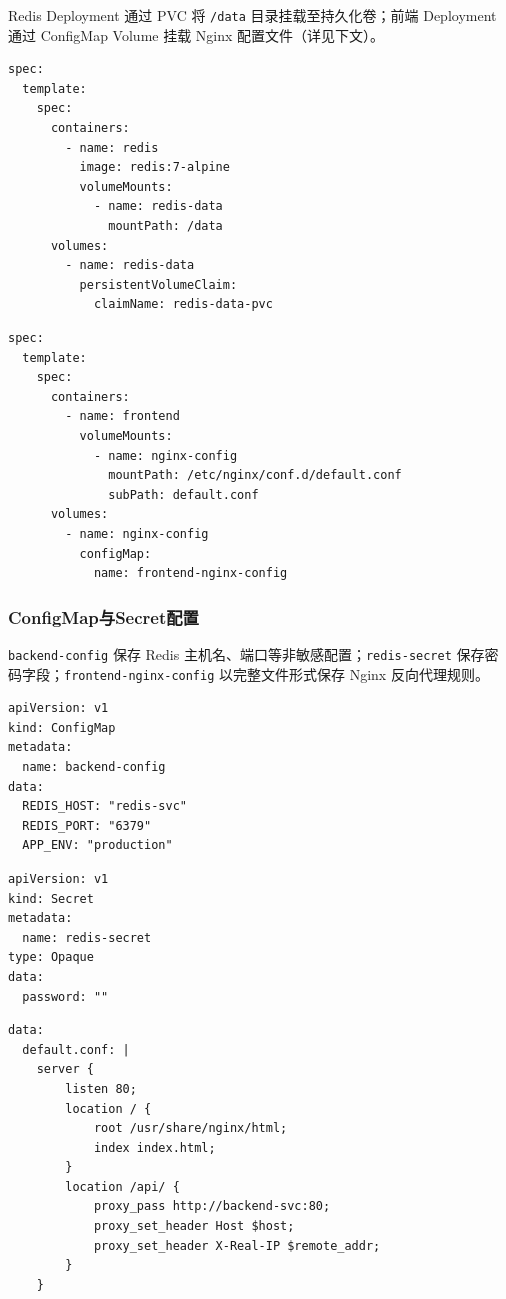 Redis Deployment 通过 PVC 将 \verb|/data| 目录挂载至持久化卷；前端 Deployment 通过 ConfigMap Volume 挂载 Nginx 配置文件（详见下文）。

\begin{lstlisting}[caption={k8s/redis-deployment.yaml（PVC 挂载节选）}, label=lst:redis-deploy]
spec:
  template:
    spec:
      containers:
        - name: redis
          image: redis:7-alpine
          volumeMounts:
            - name: redis-data
              mountPath: /data
      volumes:
        - name: redis-data
          persistentVolumeClaim:
            claimName: redis-data-pvc
\end{lstlisting}

\begin{lstlisting}[caption={k8s/frontend-deployment.yaml（ConfigMap Volume 挂载节选）}, label=lst:frontend-deploy]
spec:
  template:
    spec:
      containers:
        - name: frontend
          volumeMounts:
            - name: nginx-config
              mountPath: /etc/nginx/conf.d/default.conf
              subPath: default.conf
      volumes:
        - name: nginx-config
          configMap:
            name: frontend-nginx-config
\end{lstlisting}

\subsubsection{ConfigMap与Secret配置}

\verb|backend-config| 保存 Redis 主机名、端口等非敏感配置；\verb|redis-secret| 保存密码字段；\verb|frontend-nginx-config| 以完整文件形式保存 Nginx 反向代理规则。

\begin{lstlisting}[caption={k8s/backend-config.yaml}, label=lst:backend-config]
apiVersion: v1
kind: ConfigMap
metadata:
  name: backend-config
data:
  REDIS_HOST: "redis-svc"
  REDIS_PORT: "6379"
  APP_ENV: "production"
\end{lstlisting}

\begin{lstlisting}[caption={k8s/redis-secret.yaml}, label=lst:redis-secret]
apiVersion: v1
kind: Secret
metadata:
  name: redis-secret
type: Opaque
data:
  password: ""
\end{lstlisting}

\begin{lstlisting}[caption={k8s/frontend-nginx-config.yaml（Nginx 配置节选）}, label=lst:nginx-configmap]
data:
  default.conf: |
    server {
        listen 80;
        location / {
            root /usr/share/nginx/html;
            index index.html;
        }
        location /api/ {
            proxy_pass http://backend-svc:80;
            proxy_set_header Host $host;
            proxy_set_header X-Real-IP $remote_addr;
        }
    }
\end{lstlisting}

